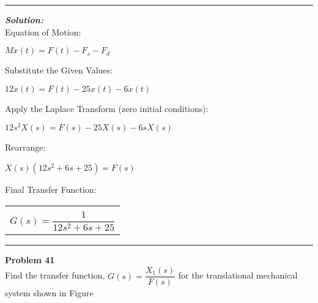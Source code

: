 \documentclass[11pt,letterpaper]{article}
\begin{document}
\rule{\textwidth}{1pt}
\vspace{12pt}
\textit{\textbf{Solution:}}\\
Equation of Motion:\\
\begin{center}
	$M\ddot{x}(t)=F(t)-F_{s}-F_{d}$\\[12pt]
\end{center}
Substitute the Given Values:\\
\begin{center}
	$12\ddot{x}(t)=F(t)-25x(t)-6\dot{x}(t)$\\
\end{center}
Apply the Laplace Transform (zero initial conditions):\\
\begin{center}
	$12s^2X(s)=F(s)-25X(s)-6sX(s)$\\[12pt]
\end{center}
Rearrange:\\
\begin{center}
	$X(s)(12s^2+6s+25)=F(s)$\\
\end{center}
Final Transfer Function:\\
\begin{center}
	\begin{tabular}{|c|}
		\hline \\
		$G(s)=\dfrac{1}{12s^2+6s+25}$\\[12pt]
		\hline
	\end{tabular}	
\end{center}

\clearpage

\rule{\textwidth}{1pt}
\textbf{Problem 41}\\
Find the transfer function, $G(s)=\dfrac{X_1(s)}{F(s)}$ for the translational mechanical system shown in Figure\\
\end{document}
